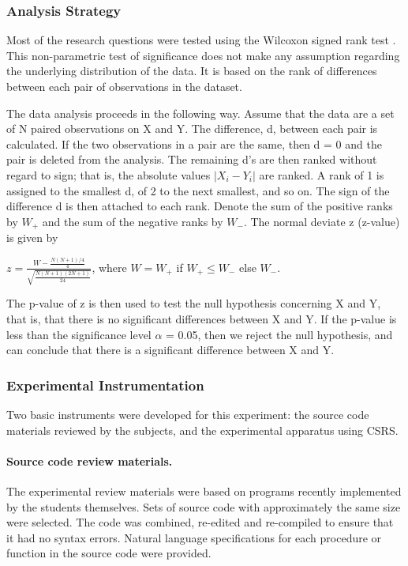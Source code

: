 \subsubsection{Analysis Strategy}

Most of the research questions were tested using the Wilcoxon signed rank
test \cite{Ferguson89}. This non-parametric test of significance does not
make any assumption regarding the underlying distribution of the data.  It
is based on the rank of differences between each pair of observations in
the dataset.

The data analysis proceeds in the following way. Assume that the data are a
set of N paired observations on X and Y. The difference, d, between each
pair is calculated.  If the two observations in a pair are the same, then d
= 0 and the pair is deleted from the analysis. The remaining d's are then ranked
without regard to sign; that is, the absolute values $|X_{i} - Y_{i}|$ are
ranked. A rank of 1 is assigned to the smallest d, of 2 to the next
smallest, and so on. The sign of the difference d is then attached to each
rank. Denote the sum of the positive ranks by $W_{+}$ and the sum of the
negative ranks by $W_{-}$. The normal deviate z (z-value) is given by

\small
 \( z = \frac{W - \frac{N(N+1)/4}{4}}{\sqrt{\frac{N(N+1)(2N+1)}{24}}} \),
where $W = W_{+}$ if $W_{+} \leq W_{-}$ else $W_{-}$.

\normalsize

The p-value of z is then used to test the null hypothesis concerning X and
Y, that is, that there is no significant differences between X and Y.  If
the p-value is less than the significance level $\alpha$ = 0.05, then we
reject the null hypothesis, and can conclude that there is a significant
difference between X and Y.

\subsubsection{Experimental Instrumentation}

Two basic instruments were developed for this experiment: the source
code materials reviewed by the subjects, and the experimental apparatus
using CSRS. 

\paragraph{Source code review materials.} 

The experimental review materials were based on programs recently
implemented by the students themselves.  Sets of source code with
approximately the same size were selected.  The code was combined, 
re-edited and re-compiled to ensure that it had no syntax errors.  
Natural language specifications for each procedure or function in 
the source code were provided.

